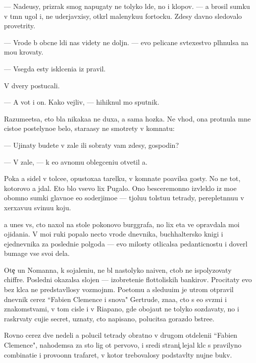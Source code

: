 \documentclass[10pt]{book}
\begin{document}
— Nade{\y}usy, prizrak smog napugaty ne tolyko l{\io}de{\y}, no i klopov. — {\Y}a brosil sumku v t{\e}mn{\yi}{\y} ugol i, ne uderjavxisy, otkr{\yi}l malenyku{\y}u fortocku. Zdesy davno sledovalo provetrity.

— Vrode b{\yi} ob{\yi}cn{\yi}{\y}e l{\io}di nas videty ne doljn{\yi}. — {\Y}evo pelican{\y}e sv{\ia}te{\y}xestvo pl{\io}hnulsa na mo{\y}u krovaty.

— Vsegda {\y}esty iskl{\io}ceni{\y}a iz pravil.

V dvery postucali.

— A vot i on. Kako{\y} vejliv{\yi}{\y}, — hihiknul mo{\y} sputnik.

Razume{\y}etsa, eto b{\yi}la nikaka{\y}a ne duxa, a sama hoz{\ia}{\y}ka. Ne vhod{\ia}, ona prot{\ia}nula mne cisto{\y}e postelyno{\y}e bel{\y}o, stara{\y}asy ne smotrety v komnatu:

— Ujinaty budete v zale ili sobraty vam zdesy, gospodin?

— V zale, — k {\y}e{\y}o {\y}avnomu oblegceni{\y}u otvetil {\y}a.

Poka {\y}a sidel v tolce{\y}e, opustoxa{\y}a tarelku, v komnate po{\y}avilsa gosty. No ne tot, kotorovo {\y}a jdal. Eto b{\yi}lo vsevo lix Pugalo. Ono besceremonno izvleklo iz mo{\y}e{\y} ob{\y}omno{\y} sumki glavno{\y}e {\y}e{\y}o soderjimo{\y}e — t{\ia}jolu{\y}u tolstu{\y}u tetrady, pereplet{\e}nnu{\y}u v xerxavu{\y}u svinu{\y}u koju.

{\Y}a unes vs{\e}, cto naxol na stole poko{\y}novo burggrafa, no lix eta ve{\x} opravdala mo{\y}i ojidani{\y}a. V mo{\y}i ruki popalo necto vrode dnevnika, buchhaltersko{\y} knigi i {\y}ejednevnika za posledni{\y}e polgoda — {\y}evo milosty otlicalsa pedanticnost{\y}u i dover{\ia}l bumage vse svo{\y}i dela.

Ote{\c} un Nomanna, k sojaleni{\y}u, ne b{\yi}l nastolyko naiven, ctob{\yi} ne ispolyzovaty chiffre. Posledni{\y} okazalsa slojen — izobreteni{\y}e flottoli{\y}skih bankirov. Procitaty {\y}evo bez kl{\io}ca ne predstavl{\ia}losy vozmojn{\yi}m. Poetomu {\y}a sledu{\y}u{\x}im je utrom otpravil dnevnik cerez ``Fabien Clemence i s{\yi}nov{\y}a" Gertrude, zna{\y}a, cto s {\y}e{\y}o sv{\ia}z{\ia}mi i znakomstvami, v tom cisle i v Riapano, gde oboja{\y}ut ne tolyko sozdavaty, no i raskr{\yi}vaty cuji{\y}e secret{\yi}, uznaty, cto napisano, polucitsa gorazdo b{\yi}stre{\y}e.

Rovno cerez dve nedeli {\y}a polucil tetrady obratno v drugom otdeleni{\y}i ``Fabien Clemence", nahod{\ia}{\x}emsa za sto lig ot pervovo, i sredi strani{\c} lejal kl{\io}c s pravilyno{\y} combinati{\y}e{\y} i provo{\x}onn{\yi}{\y} trafaret, v kotor{\yi}{\y} trebovalosy podstavl{\ia}ty nujn{\yi}{\y}e bukv{\yi}.
\end{document}
